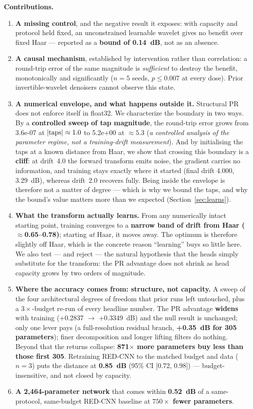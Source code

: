 \documentclass[conference]{IEEEtran}
\begin{document}
\textbf{Contributions.}
\begin{enumerate}
\item \textbf{A missing control}, and the negative result it exposes: with
capacity and protocol held fixed, an unconstrained learnable wavelet gives no
benefit over fixed Haar --- reported as a \textbf{bound of 0.14~dB}, not as an
absence.
\item \textbf{A causal mechanism}, established by intervention rather than
correlation: a round-trip error of the same magnitude is \emph{sufficient} to
destroy the benefit, monotonically and significantly ($n=5$ seeds,
$p \le 0.007$ at every dose). Prior invertible-wavelet denoisers cannot observe
this state.
\item \textbf{A numerical envelope, and what happens outside it.} Structural PR
does not enforce itself in float32. We characterize the boundary in two ways. By
a \textbf{controlled sweep of tap magnitude}, the round-trip error grows from
3.6e-07 at $|{\rm taps}| \approx 1.0$ to 5.2e+00 at $\approx 5.3$
(\emph{a controlled analysis of the parameter regime, not a training-drift
measurement}). And by initialising the taps at a known distance from Haar, we
show that crossing this boundary is a \textbf{cliff}: at drift~4.0 the forward
transform emits noise, the gradient carries no information, and training stays
exactly where it started (final drift 4.000, 3.29~dB), whereas drift~2.0
recovers fully. Being inside the envelope is therefore not a matter of degree ---
which is why we bound the taps, and why the bound's value matters more than we
expected (Section~\ref{sec:learns}).
\item \textbf{What the transform actually learns.} From any numerically intact
starting point, training converges to a \textbf{narrow band of drift from Haar
($\approx$0.65--0.78)}; starting \emph{at} Haar, it moves away. The optimum is
therefore slightly off Haar, which is the concrete reason ``learning'' buys so
little here. We also test --- and reject --- the natural hypothesis that the heads
simply substitute for the transform: the PR advantage does not shrink as head
capacity grows by two orders of magnitude.
\item \textbf{Where the accuracy comes from: structure, not capacity.} A sweep of
the four architectural degrees of freedom that prior runs left untouched, plus a
$3\times$-budget re-run of every headline number. The PR advantage
\textbf{widens} with training (+0.2837 $\to$ +0.3349~dB) and the null result is
unchanged; only one lever pays (a full-resolution residual branch, \textbf{+0.35~dB
for 305 parameters}); finer decomposition and longer lifting filters do nothing.
Beyond that the returns collapse: \textbf{871$\times$ more parameters buy less
than those first 305}. Retraining RED-CNN to the matched budget and data ($n=3$)
puts the distance at \textbf{0.85~dB} (95\% CI [0.72, 0.98]) --- budget-insensitive,
and not closed by capacity.
\item \textbf{A 2,464-parameter network} that comes within \textbf{0.52~dB} of a
same-protocol, same-budget RED-CNN baseline at \textbf{$750\times$ fewer parameters}.
\end{enumerate}
\end{document}
